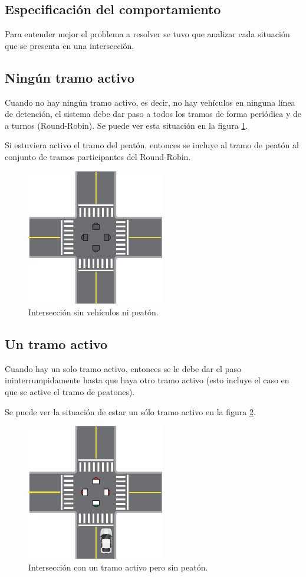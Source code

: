 \subsection{Especificación del comportamiento}
Para entender mejor el problema a resolver se tuvo que analizar cada situación que se presenta en una intersección.
\subsection{Ningún tramo activo}
Cuando no hay ningún tramo activo, es decir, no hay vehículos en ninguna línea de detención, el sistema debe dar paso a todos los tramos de forma periódica y de a turnos (Round-Robin). Se puede ver esta situación en la figura \ref{fig:ningun-activo}.

Si estuviera activo el tramo del peatón, entonces se incluye al tramo de peatón al conjunto de tramos participantes del Round-Robin.

\begin{figure}[htbp]
	\centering
	\includegraphics[width=6cm]{imagenes/ningun-activo.eps}
	\caption{Intersección sin vehículos ni peatón.}
	\label{fig:ningun-activo}
\end{figure}

\subsection{Un tramo activo}
Cuando hay un solo tramo activo, entonces se le debe dar el paso ininterrumpidamente hasta que haya otro tramo activo (esto incluye el caso en que se active el tramo de peatones).

Se puede ver la situación de estar un sólo tramo activo en la figura \ref{fig:un-activo}.

\begin{figure}[htbp]
	\centering
	\includegraphics[width=6cm]{imagenes/un-activo.eps}
	\caption{Intersección con un tramo activo pero sin peatón.}
	\label{fig:un-activo}
\end{figure}

